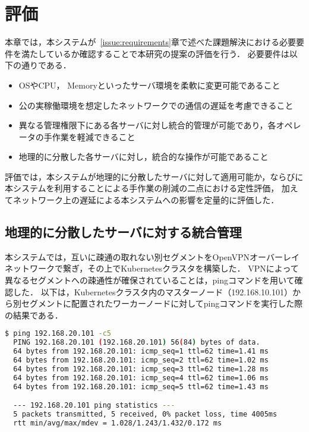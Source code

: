 \chapter{評価}
\label{evaluation}

本章では，本システムが~\ref{issue:requirements}章で述べた課題解決における必要要件を満たしているか確認することで本研究の提案の評価を行う．
必要要件は以下の通りである．
\begin{itemize}
  \item OSやCPU， Memoryといったサーバ環境を柔軟に変更可能であること
  \item 公の実稼働環境を想定したネットワークでの通信の遅延を考慮できること
  \item 異なる管理権限下にある各サーバに対し統合的管理が可能であり，各オペレータの手作業を軽減できること
  \item 地理的に分散した各サーバに対し，統合的な操作が可能であること
\end{itemize}
評価では，本システムが地理的に分散したサーバに対して適用可能か，ならびに本システムを利用することによる手作業の削減の二点における定性評価，
加えてネットワーク上の遅延による本システムへの影響を定量的に評価した．

\section{地理的に分散したサーバに対する統合管理}

本システムでは，互いに疎通の取れない別セグメントをOpenVPNオーバーレイネットワークで繋ぎ，その上でKubernetesクラスタを構築した．
VPNによって異なるセグメントへの疎通性が確保されていることは，pingコマンドを用いて確認した．
以下は，Kubernetesクラスタ内のマスターノード（192.168.10.101）から別セグメントに配置されたワーカーノードに対してpingコマンドを実行した際の結果である．

\begin{lstlisting}[language=bash]
  $ ping 192.168.20.101 -c5
  PING 192.168.20.101 (192.168.20.101) 56(84) bytes of data.
  64 bytes from 192.168.20.101: icmp_seq=1 ttl=62 time=1.41 ms
  64 bytes from 192.168.20.101: icmp_seq=2 ttl=62 time=1.02 ms
  64 bytes from 192.168.20.101: icmp_seq=3 ttl=62 time=1.28 ms
  64 bytes from 192.168.20.101: icmp_seq=4 ttl=62 time=1.06 ms
  64 bytes from 192.168.20.101: icmp_seq=5 ttl=62 time=1.43 ms

  --- 192.168.20.101 ping statistics ---
  5 packets transmitted, 5 received, 0% packet loss, time 4005ms
  rtt min/avg/max/mdev = 1.028/1.243/1.432/0.172 ms
\end{lstlisting}

